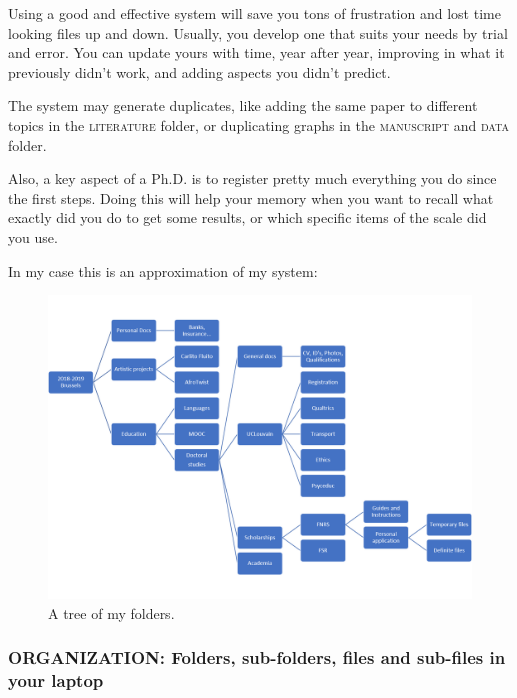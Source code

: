 \documentclass{article}
\begin{document}
Using a good and effective system will save you tons of frustration and lost time looking files up and down. Usually, you develop one that suits your needs by trial and error. You can update yours with time, year after year, improving in what it previously didn't work, and adding aspects you didn't predict.

The system may generate duplicates, like adding the same paper to different topics in the \textsc{literature} folder, or duplicating graphs in the \textsc{manuscript} and \textsc{data} folder. 

Also, a key aspect of a Ph.D. is to register pretty much everything you do since the first steps. Doing this will help your memory when you want to recall what exactly did you do to get some results, or which specific items of the scale did you use.

In my case this is an approximation of my system: 

\begin{landscape}
\begin{figure}
\centering
\includegraphics[height = 0.75\textwidth]{images/tree1.png}
\caption{A tree of my folders.}
\label{fig: tree1}
\end{figure}
\end{landscape}

\subsubsection{ORGANIZATION: Folders, sub-folders, files and sub-files in your laptop}
\label{subsubsec: organization}
\end{document}
